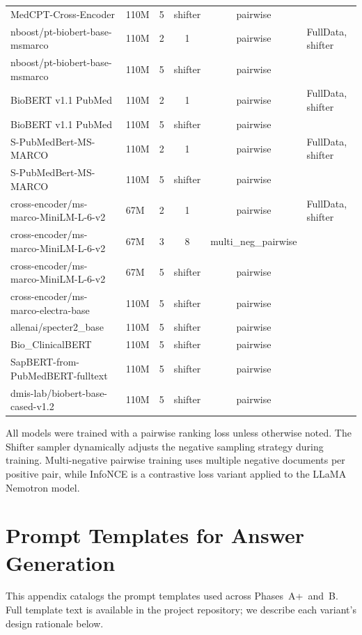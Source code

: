\begin{table}[ht]
\begin{tabular}{llcccl}
    MedCPT-Cross-Encoder & 110M & 5 & shifter & pairwise & \\
    nboost/pt-biobert-base-msmarco & 110M & 2 & 1 & pairwise & FullData, shifter \\
    nboost/pt-biobert-base-msmarco & 110M & 5 & shifter & pairwise & \\
    BioBERT v1.1 PubMed & 110M & 2 & 1 & pairwise & FullData, shifter \\
    BioBERT v1.1 PubMed & 110M & 5 & shifter & pairwise & \\
    S-PubMedBert-MS-MARCO & 110M & 2 & 1 & pairwise & FullData, shifter \\
    S-PubMedBert-MS-MARCO & 110M & 5 & shifter & pairwise & \\
    cross-encoder/ms-marco-MiniLM-L-6-v2 & 67M & 2 & 1 & pairwise & FullData, shifter \\
    cross-encoder/ms-marco-MiniLM-L-6-v2 & 67M & 3 & 8 & multi\_neg\_pairwise & \\
    cross-encoder/ms-marco-MiniLM-L-6-v2 & 67M & 5 & shifter & pairwise & \\
    cross-encoder/ms-marco-electra-base & 110M & 5 & shifter & pairwise & \\
    allenai/specter2\_base & 110M & 5 & shifter & pairwise & \\
    Bio\_ClinicalBERT & 110M & 5 & shifter & pairwise & \\
    SapBERT-from-PubMedBERT-fulltext & 110M & 5 & shifter & pairwise & \\
    dmis-lab/biobert-base-cased-v1.2 & 110M & 5 & shifter & pairwise & \\
    \bottomrule
  \end{tabular}
\end{table}

\noindent All models were trained with a pairwise ranking loss unless otherwise noted. The Shifter sampler dynamically adjusts the negative sampling strategy during training. Multi-negative pairwise training uses multiple negative documents per positive pair, while InfoNCE is a contrastive loss variant applied to the LLaMA Nemotron model.

\section{Prompt Templates for Answer Generation}

\noindent This appendix catalogs the prompt templates used across Phases~A+~and~B. Full template text is available in the project repository; we describe each variant's design rationale below.
